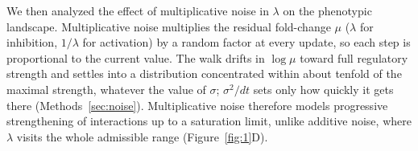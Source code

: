 \documentclass[11pt]{article}
\providecommand{\DIFaddtex}[1]{{\protect\color{red}#1}} %
\providecommand{\DIFdeltex}[1]{} %
\providecommand{\DIFaddbegin}{} %
\providecommand{\DIFaddend}{} %
\providecommand{\DIFdelbegin}{} %
\providecommand{\DIFdelend}{} %
\providecommand{\DIFadd}[1]{\texorpdfstring{\DIFaddtex{#1}}{#1}} %
\providecommand{\DIFdel}[1]{\texorpdfstring{\DIFdeltex{#1}}{}} %
\providecommand{\DIFaddincludegraphics}[2][]{\DIFOincludegraphics[#1]{#2}} %
\providecommand{\DIFdelincludegraphics}[2][]{}
\DeclareRobustCommand{\DIFaddbegin}{\DIFOaddbegin \let\includegraphics\DIFaddincludegraphics} %
\DeclareRobustCommand{\DIFaddend}{\DIFOaddend \let\includegraphics\DIFOincludegraphics} %
\DeclareRobustCommand{\DIFdelbegin}{\DIFOdelbegin \let\includegraphics\DIFdelincludegraphics} %
\DeclareRobustCommand{\DIFdelend}{\DIFOaddend \let\includegraphics\DIFOincludegraphics} %
\begin{document}
We then analyzed the effect of multiplicative noise in $\lambda$ on the phenotypic landscape. \DIFdelbegin \DIFdel{Briefly, multiplicative noise models a random walk in }\DIFdelend \DIFaddbegin \DIFadd{Multiplicative noise multiplies the residual fold-change $\mu$ (}\DIFaddend $\lambda$ \DIFdelbegin \DIFdel{with a state-dependent step size. For inhibitory interactions, the noise amplitude is smaller near $\lambda \approx 0$ and larger near $\lambda \approx 1$. This asymmetry makes $\lambda$ approach 0 over time}\DIFdelend \DIFaddbegin \DIFadd{for inhibition, $1/\lambda$ for activation) by a random factor at every update, so each step is proportional to the current value. The walk drifts in $\log\mu$ toward full regulatory strength and settles into a distribution concentrated within about tenfold of the maximal strength, whatever the value of $\sigma$; $\sigma^2/dt$ sets only how quickly it gets there (Methods~\ref{sec:noise}). Multiplicative noise therefore models progressive strengthening of interactions up to a saturation limit}\DIFaddend , unlike additive noise\DIFaddbegin \DIFadd{, }\DIFaddend where $\lambda$ visits \DIFdelbegin \DIFdel{both the boundaries and the intermediate values at intermediate $\sigma$ }\DIFdelend \DIFaddbegin \DIFadd{the whole admissible range }\DIFaddend (Figure~\ref{fig:1}D).
\DIFdelbegin \DIFdel{While this concentration of $\lambda$ near $0$ may seem like a deterministic behavior, we will see below that stochasticity has a strong impact on the outcome of multiplicative noise, even more so in certain cases than additive noise. 
}\DIFdelend 
\end{document}
